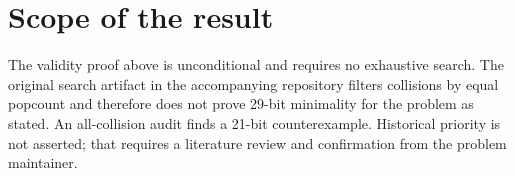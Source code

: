 \documentclass[11pt]{article}
\begin{document}
\section*{Scope of the result}
The validity proof above is unconditional and requires no exhaustive search. The original search artifact in the accompanying repository filters collisions by equal popcount and therefore does not prove 29-bit minimality for the problem as stated. An all-collision audit finds a 21-bit counterexample. Historical priority is not asserted; that requires a literature review and confirmation from the problem maintainer.
\end{document}
